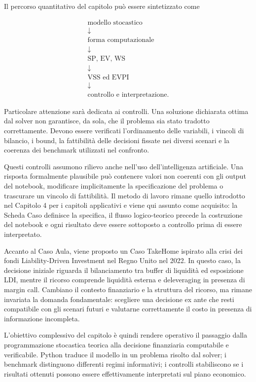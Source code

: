 Il percorso quantitativo del capitolo pu\`o essere sintetizzato come

\[
\begin{array}{c}
\text{modello stocastico}
\\[3pt]
\downarrow
\\[3pt]
\text{forma computazionale}
\\[3pt]
\downarrow
\\[3pt]
\text{SP, EV, WS}
\\[3pt]
\downarrow
\\[3pt]
\text{VSS ed EVPI}
\\[3pt]
\downarrow
\\[3pt]
\text{controllo e interpretazione}.
\end{array}
\]

Particolare attenzione sar\`a dedicata ai controlli. Una soluzione dichiarata
ottima dal solver non garantisce, da sola, che il problema sia stato tradotto
correttamente. Devono essere verificati l'ordinamento delle variabili, i
vincoli di bilancio, i bound, la fattibilit\`a delle decisioni fissate nei
diversi scenari e la coerenza dei benchmark utilizzati nel confronto.

Questi controlli assumono rilievo anche nell'uso dell'intelligenza
artificiale. Una risposta formalmente plausibile pu\`o contenere valori non
coerenti con gli output del notebook, modificare implicitamente la
specificazione del problema o trascurare un vincolo di fattibilit\`a. Il
metodo di lavoro rimane quello introdotto nel Capitolo 4 per i capitoli
applicativi e viene qui assunto come acquisito: la Scheda Caso definisce la
specifica, il flusso logico-teorico precede la costruzione del notebook e ogni
risultato deve essere sottoposto a controllo prima di essere interpretato.

Accanto al Caso Aula, viene proposto un Caso TakeHome ispirato alla crisi dei
fondi Liability-Driven Investment nel Regno Unito nel 2022. In questo caso,
la decisione iniziale riguarda il bilanciamento tra buffer di liquidit\`a ed
esposizione LDI, mentre il ricorso comprende liquidit\`a esterna e
deleveraging in presenza di margin call. Cambiano il contesto finanziario e
la struttura del ricorso, ma rimane invariata la domanda fondamentale:
scegliere una decisione ex ante che resti compatibile con gli scenari futuri
e valutarne correttamente il costo in presenza di informazione incompleta.

L'obiettivo complessivo del capitolo \`e quindi rendere operativo il passaggio
dalla programmazione stocastica teorica alla decisione finanziaria
computabile e verificabile. Python traduce il modello in un problema risolto
dal solver; i benchmark distinguono differenti regimi informativi; i
controlli stabiliscono se i risultati ottenuti possono essere effettivamente
interpretati sul piano economico.




